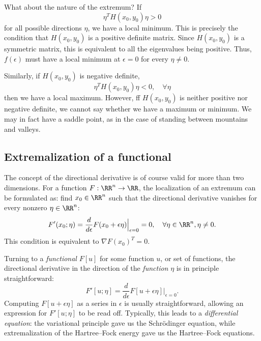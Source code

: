 What about the nature of the extremum? If
\begin{equation}
  \eta^T H(x_0,y_0) \eta > 0
\end{equation}
for all possible directions $\eta$, we have a local minimum. This is
precisely the condition that $H(x_0,y_0)$ is a positive definite
matrix. Since
$H(x_0,y_0)$ is a symmetric matrix, this is equivalent to all the
eigenvalues being positive. Thus, $f(\epsilon)$ must have a local
minimum at $\epsilon=0$ for every $\eta\neq 0$.

Similarly, if $H(x_0,y_0)$ is negative definite,
\begin{equation}
  \eta^T H(x_0,y_0) \eta < 0, \quad \forall \eta
\end{equation}
then we have a local maximum. However, ff $H(x_0,y_0)$ is neither positive nor
negative definite, we cannot say whether we have a maximum or
minimum. We may in fact have a saddle point, as in the case of
standing between mountains and valleys.



\subsection{Extremalization of a functional}

The concept of the directional derivative is of course valid for more
than two dimensions. For a function $F : \RR^n \to \RR$, the
localization of an extremum can be formulated as: find $x_0 \in
\RR^n$ such that the directional derivative vanishes for every nonzero
$\eta
\in \RR^n$:
\begin{equation}
  F'(x_0;\eta) = \frac{d}{d\epsilon}
  F(x_0+\epsilon\eta)\Big|_{\epsilon=0} = 0, \quad \forall \eta \in
  \RR^n, \eta\neq 0.
 \label{eq:2d-directional}
\end{equation}
This condition is equivalent to $\nabla F(x_0)^T=0$.



Turning to a \emph{functional} $F[u]$ for some function $u$, or set of
functions, the directional derivative in the direction of the
\emph{function} $\eta$ is in principle straightforward:
\begin{equation}
  F'[u;\eta] = \frac{d}{d\epsilon}
  F[u+\epsilon\eta]\Big|_{\epsilon=0}.
\end{equation}
Computing $F[u +\epsilon \eta]$ as a series in $\epsilon$ is usually
straightforward, allowing an expression for $F'[u;\eta]$ to be read
off. Typically, this leads to a \emph{differential
  equation}: the variational principle gave us the Schr\"odinger
equation, while extremalization of the Hartree--Fock energy gave us
the Hartree--Fock equations.

